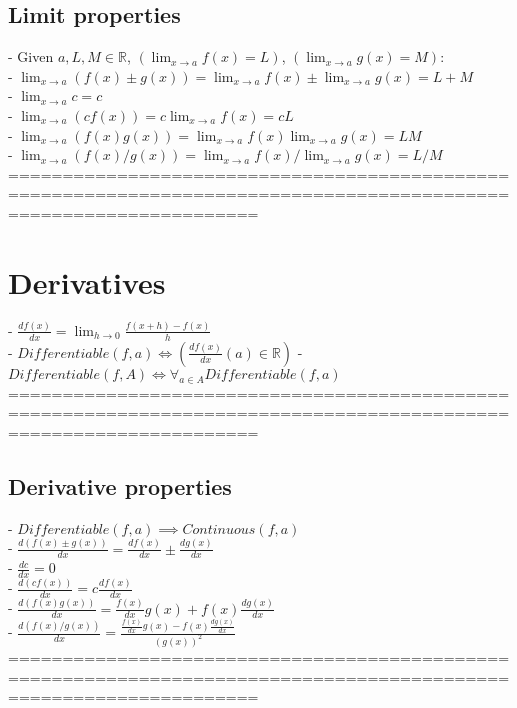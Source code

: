 \documentclass{book}
\begin{document}
\subsection{Limit properties}
	- Given $a, L, M \in \mathbb{R}$, $(\lim_{x \to a} f(x) = L)$, $(\lim_{x \to a} g(x) = M)$: \\
	- $\lim_{x \to a} (f(x) \pm g(x)) = \lim_{x \to a} f(x) \pm \lim_{x \to a} g(x) = L + M$ \\ %
	- $\lim_{x \to a} c = c$ \\ %
	- $\lim_{x \to a} (c f(x)) = c \lim_{x \to a} f(x) = c L$ \\ %
	- $\lim_{x \to a} (f(x) g(x)) = \lim_{x \to a} f(x) \lim_{x \to a} g(x) = L M$ \\ %
	- $\lim_{x \to a} (f(x) / g(x)) = \lim_{x \to a} f(x) / \lim_{x \to a} g(x) = L / M$ \\ %
	===================================================================================================================
\section{Derivatives}
	- $\frac{df(x)}{dx} = \lim_{h \rightarrow 0} \frac{f(x+h) - f(x)}{h}$ \\
	- $Differentiable(f, a) \iff (\frac{df(x)}{dx}(a) \in \mathbb{R})$
	- $Differentiable(f, A) \iff \forall_{a \in A} Differentiable(f, a)$ \\
	===================================================================================================================
\subsection{Derivative properties} %
	- $Differentiable(f, a) \implies Continuous(f, a)$ \\
	- $\frac{d(f(x) \pm g(x))}{dx} = \frac{df(x)}{dx} \pm \frac{dg(x)}{dx}$ \\
	- $\frac{dc}{dx} = 0$ \\
	- $\frac{d(c f(x))}{dx} = c \frac{df(x)}{dx}$ \\
	- $\frac{d(f(x) g(x))}{dx} = \frac{f(x)}{dx} g(x) + f(x) \frac{dg(x)}{dx}$ \\
	- $\frac{d(f(x) / g(x))}{dx} =  \frac{\frac{f(x)}{dx} g(x) - f(x) \frac{dg(x)}{dx}}{(g(x))^2}$ \\
	===================================================================================================================
\end{document}
